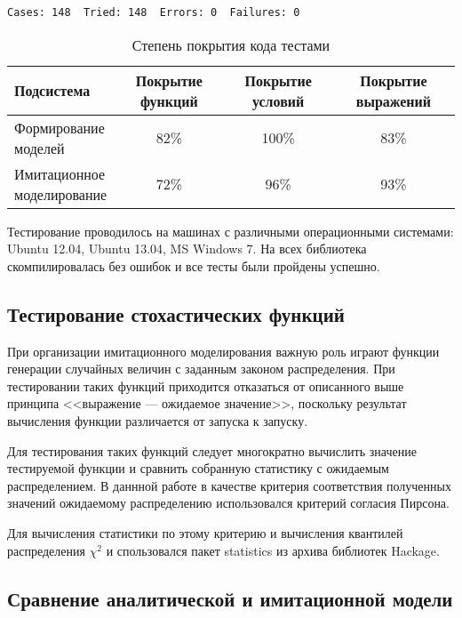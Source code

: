 \begin{verbatim}
Cases: 148  Tried: 148  Errors: 0  Failures: 0
\end{verbatim}

\begin{table}[ht!]
\caption{Степень покрытия кода тестами}
\begin{tabular}{|p{}|c|c|c|}
\hline
Подсистема & Покрытие функций & Покрытие условий & Покрытие выражений\\
\hline
\parbox{0.25\textwidth} {Формирование \\моделей }& 82\% & 100\% & 83\% \\
\hline
\parbox{0.25\textwidth} {Имитационное \\моделирование }& 72\% & 96\% & 93\% \\
\hline
\end{tabular}
\label{tab:coverage}
\end{table}

Тестирование проводилось на машинах с различными операционными системами: Ubuntu 12.04, Ubuntu 13.04, MS Windows 7. На всех библиотека скомпилировалась без ошибок и все тесты были пройдены успешно.


\subsection{Тестирование стохастических функций}

При организации имитационного моделирования важную роль играют функции генерации случайных величин с заданным законом распределения. При тестировании таких функций приходится отказаться от описанного выше принципа <<выражение --- ожидаемое значение>>, поскольку результат вычисления функции различается от запуска к запуску.

Для тестирования таких функций следует многократно вычислить значение тестируемой функции и сравнить собранную статистику с ожидаемым распределением. В даннной работе в качестве критерия соответствия полученных значений ожидаемому распределению использовался критерий согласия Пирсона.

Для вычисления статистики по этому критерию и вычисления квантилей распределения $\chi^2$ и спользовался пакет statistics из архива библиотек Hackage.

\subsection{Сравнение аналитической и имитационной модели}

